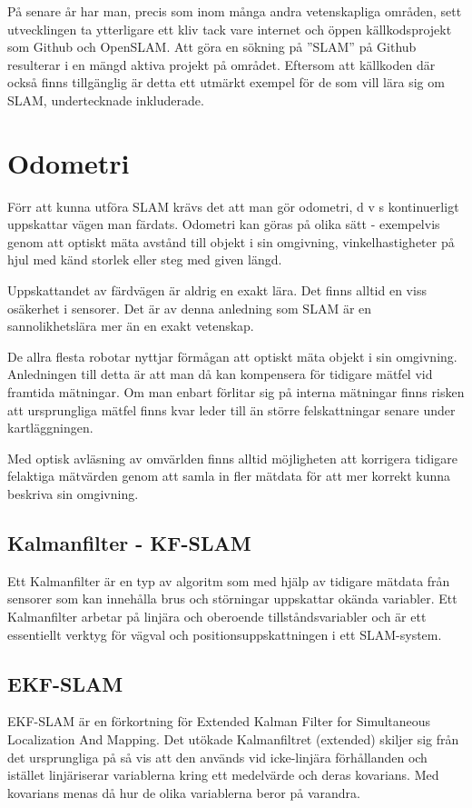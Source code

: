 \documentclass[a4paper,12pt,fleqn]{article}
\begin{document}
På senare år har man, precis som inom många andra vetenskapliga områden, sett utvecklingen ta ytterligare ett kliv tack vare internet och öppen källkodsprojekt som Github och OpenSLAM. Att göra en sökning på ''SLAM'' på Github resulterar i en mängd aktiva projekt på området. Eftersom att källkoden där också finns tillgänglig är detta ett utmärkt exempel för de som vill lära sig om SLAM, undertecknade inkluderade. 

\newpage
\section{Odometri}

Förr att kunna utföra SLAM krävs det att man gör odometri, d v s kontinuerligt uppskattar vägen man färdats. Odometri kan göras på olika sätt - exempelvis genom att optiskt mäta avstånd till objekt i sin omgivning, vinkelhastigheter på hjul med känd storlek eller steg med given längd. 

Uppskattandet av färdvägen är aldrig en exakt lära. Det finns alltid en viss osäkerhet i sensorer. Det är av denna anledning som SLAM är en sannolikhetslära mer än en exakt vetenskap. 

De allra flesta robotar nyttjar förmågan att optiskt mäta objekt i sin omgivning. Anledningen till detta är att man då kan kompensera för tidigare mätfel vid framtida mätningar. Om man enbart förlitar sig på interna mätningar finns risken att ursprungliga mätfel finns kvar leder till än större felskattningar senare under kartläggningen. 

Med optisk avläsning av omvärlden finns alltid möjligheten att korrigera tidigare felaktiga mätvärden genom att samla in fler mätdata för att mer korrekt kunna beskriva sin omgivning. 

\subsection{Kalmanfilter - KF-SLAM}
Ett Kalmanfilter är en typ av algoritm som med hjälp av 
tidigare mätdata från sensorer som kan innehålla brus och störningar uppskattar okända variabler. Ett Kalmanfilter arbetar på linjära och oberoende tillståndsvariabler och är ett essentiellt verktyg för vägval och positionsuppskattningen i ett SLAM-system. 

\subsection{EKF-SLAM} 
EKF-SLAM är en förkortning för Extended Kalman Filter for Simultaneous 
Localization And Mapping. Det utökade Kalmanfiltret (extended) skiljer sig från det ursprungliga på så vis att den används vid icke-linjära förhållanden och istället linjäriserar variablerna kring ett medelvärde och deras kovarians. Med kovarians menas då hur de olika variablerna beror på varandra.
\end{document}
